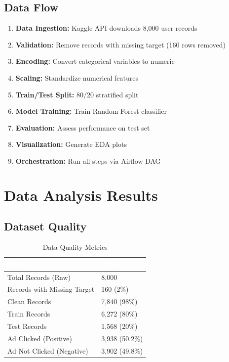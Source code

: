 \documentclass[11pt,a4paper]{article}
\begin{document}
\subsection{Data Flow}

\begin{enumerate}[leftmargin=*, label=\textbf{\arabic*.}]
  \item \textbf{Data Ingestion:} Kaggle API downloads 8,000 user records
  \item \textbf{Validation:} Remove records with missing target (160 rows removed)
  \item \textbf{Encoding:} Convert categorical variables to numeric
  \item \textbf{Scaling:} Standardize numerical features
  \item \textbf{Train/Test Split:} 80/20 stratified split
  \item \textbf{Model Training:} Train Random Forest classifier
  \item \textbf{Evaluation:} Assess performance on test set
  \item \textbf{Visualization:} Generate EDA plots
  \item \textbf{Orchestration:} Run all steps via Airflow DAG
\end{enumerate}

\section{Data Analysis Results}

\subsection{Dataset Quality}

\begin{table}[H]
\centering
\caption{Data Quality Metrics}
\small
\begin{tabular}{L{4cm} C{3.5cm}}
\toprule
{}
\textcolor{white}{\textbf{Metric}} &
\textcolor{white}{\textbf{Value}} \\
\midrule
Total Records (Raw) & 8,000 \\
Records with Missing Target & 160 (2\%) \\
Clean Records & 7,840 (98\%) \\
Train Records & 6,272 (80\%) \\
Test Records & 1,568 (20\%) \\
Ad Clicked (Positive) & 3,938 (50.2\%) \\
Ad Not Clicked (Negative) & 3,902 (49.8\%) \\
\bottomrule
\end{tabular}
\end{table}
\end{document}
